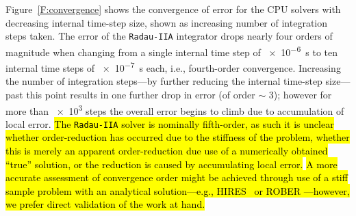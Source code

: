 \documentclass[preprint,review,11pt]{elsarticle}
\DeclareRobustCommand{\hlb}[1]{\sethlcolor{SkyBlue}\hl{#1}}
\begin{document}
Figure~\ref{F:convergence} shows the convergence of error for the CPU solvers with decreasing internal time-step size, shown as increasing number of integration steps taken.
The error of the \texttt{Radau-IIA} integrator drops nearly four orders of magnitude when changing from a single internal time step of \SI{e-6}{\second} to ten internal time steps of \SI{e-7}{\second} each, i.e., fourth-order convergence.
Increasing the number of integration steps---by further reducing the internal time-step size---past this point results in one further drop in error (of order $\sim$ 3); however for more than \num{e3} steps the overall error begins to climb due to accumulation of local error.
\hlb{The {\texttt{Radau-IIA}} solver is nominally fifth-order, as such it is unclear whether order-reduction has occurred due to the stiffness of the problem, whether this is merely an apparent order-reduction due use of a numerically obtained ``true'' solution, or the reduction is caused by accumulating local error.}
\hlb{A more accurate assessment of convergence order might be achieved through use of a stiff sample problem with an analytical solution---e.g., HIRES~\cite{lioen1998test} or ROBER \cite{robertson1966solution}---however, we prefer direct validation of the work at hand.}
\end{document}

